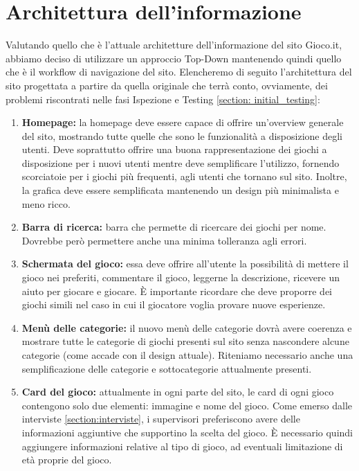 \documentclass[../Report.tex]{subfiles}
\begin{document}
    \section{Architettura dell'informazione}
    \label{section:architettura dell'informazione}
    Valutando quello che è l'attuale architetture dell'informazione del sito Gioco.it, abbiamo deciso di utilizzare un approccio Top-Down mantenendo quindi quello che è il workflow di navigazione del sito. Elencheremo di seguito l'architettura del sito progettata a partire da quella originale che terrà conto, ovviamente, dei problemi riscontrati nelle fasi Ispezione e Testing \ref{section: initial_testing}:
    \begin{enumerate}
        \item \textbf{Homepage:} la homepage deve essere capace di offrire un'overview generale del sito, mostrando tutte quelle che sono le funzionalità a disposizione degli utenti. Deve soprattutto offrire una buona rappresentazione dei giochi a disposizione per i nuovi utenti mentre deve semplificare l'utilizzo, fornendo scorciatoie per i giochi più frequenti, agli utenti che tornano sul sito. Inoltre, la grafica deve essere semplificata mantenendo un design più minimalista e meno ricco.
        \item \textbf{Barra di ricerca:} barra che permette di ricercare dei giochi per nome. Dovrebbe però permettere anche una minima tolleranza agli errori.
        \item \textbf{Schermata del gioco:} essa deve offrire all'utente la possibilità di mettere il gioco nei preferiti, commentare il gioco, leggerne la descrizione, ricevere un aiuto per giocare e giocare. È importante ricordare che deve proporre dei giochi simili nel caso in cui il giocatore voglia provare nuove esperienze.
        \item \textbf{Menù delle categorie:} il nuovo menù delle categorie dovrà avere coerenza e mostrare tutte le categorie di giochi presenti sul sito senza nascondere alcune categorie (come accade con il design attuale). Riteniamo necessario anche una semplificazione delle categorie e sottocategorie attualmente presenti.
        \item \textbf{Card del gioco:} attualmente in ogni parte del sito, le card di ogni gioco contengono solo due elementi: immagine e nome del gioco. Come emerso dalle interviste \ref{section:interviste}, i supervisori preferiscono avere delle informazioni aggiuntive che supportino la scelta del gioco. È necessario quindi aggiungere informazioni relative al tipo di gioco, ad eventuali limitazione di età proprie del gioco.

\end{enumerate}
\end{document}

